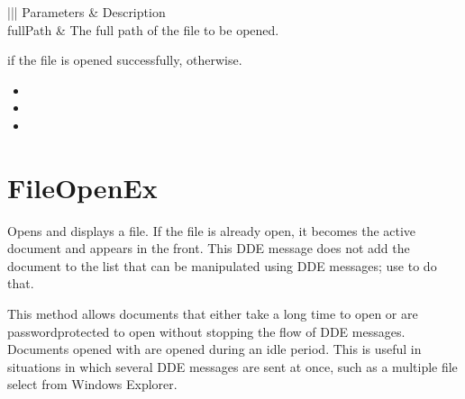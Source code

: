 \documentclass[letterpaper,12pt,english,openany,oneside]{sphinxmanual}
\begin{document}
\begin{savenotes}\sphinxattablestart
\centering
{}\label{\detokenize{IAC_API_DDE_Messages:section-18}}\nobreak
\begin{tabular}[t]{|||}
\hline
\sphinxstyletheadfamily 
Parameters
&\sphinxstyletheadfamily 
Description
\\
\hline
fullPath
&
The full path of the file to be opened.
\\
\hline
\end{tabular}
\par
\sphinxattableend\end{savenotes}


 if the file is opened successfully,  otherwise.

\label{\detokenize{IAC_API_DDE_Messages:related-methods-18}}
\begin{itemize}
\item {} 

\item {} 

\item {} 

\end{itemize}




\section{FileOpenEx}
\label{\detokenize{IAC_API_DDE_Messages:id37}}
Opens and displays a file. If the file is already open, it becomes the active document and appears in the front. This DDE message does not add the document to the list that can be manipulated using DDE messages; use  to do that.

This method allows documents that either take a long time to open or are password\sphinxhyphen{}protected to open without stopping the flow of DDE messages. Documents opened with  are opened during an idle period. This is useful in situations in which several DDE messages are sent at once, such as a multiple file select from Windows Explorer.
\end{document}
